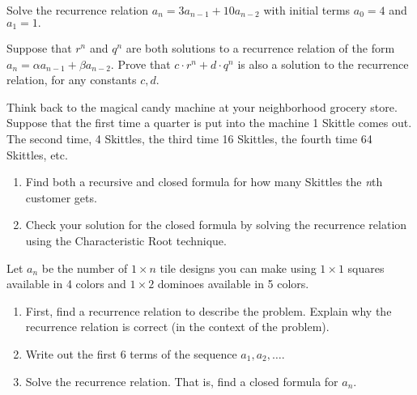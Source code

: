 \documentclass[11pt,]{book}
\theoremstyle{ptxplainnotitle}
\theoremstyle{ptxplaintitle}
\theoremstyle{ptxdefinitionnotitle}
\theoremstyle{ptxdefinitiontitle}
\theoremstyle{ptxdefinitionnotitle}
\theoremstyle{ptxdefinitiontitle}
\theoremstyle{ptxdefinitionnotitle}
\theoremstyle{ptxdefinitiontitle}
\theoremstyle{ptxdefinitiontitlenonumber}
\theoremstyle{ptxdefinitiontitlenonumber}
\numberwithin{equation}{chapter}
\begin{document}
\begin{divisionexercise}{7}\hypertarget{exercise-48}{}
\hypertarget{p-502}{}%
Solve the recurrence relation \(a_n = 3a_{n-1} + 10a_{n-2}\) with initial terms \(a_0 = 4\) and \(a_1 = 1\text{.}\)%
\end{divisionexercise}%
\begin{divisionexercise}{8}\hypertarget{exercise-49}{}
\hypertarget{p-505}{}%
Suppose that \(r^n\) and \(q^n\) are both solutions to a recurrence relation of the form \(a_n = \alpha a_{n-1} + \beta a_{n-2}\).  Prove that \(c\cdot r^n + d \cdot q^n\) is also a solution to the recurrence relation, for any constants \(c, d\).%
\end{divisionexercise}%
\begin{divisionexercise}{9}\hypertarget{exercise-50}{}
\hypertarget{p-506}{}%
Think back to the magical candy machine at your neighborhood grocery store. Suppose that the first time a quarter is put into the machine 1 Skittle comes out. The second time, 4 Skittles, the third time 16 Skittles, the fourth time 64 Skittles, etc. \leavevmode%
\begin{enumerate}[label=(\alph*)]
\item\hypertarget{li-227}{}\hypertarget{p-507}{}%
Find both a recursive and closed formula for how many Skittles the \emph{n}th customer gets.%
\item\hypertarget{li-228}{}\hypertarget{p-508}{}%
Check your solution for the closed formula by solving the recurrence relation using the Characteristic Root technique.%
\end{enumerate}
%
\end{divisionexercise}%
\begin{divisionexercise}{10}\hypertarget{exercise-51}{}
\hypertarget{p-509}{}%
Let \(a_n\) be the number of \(1 \times n\) tile designs you can make using \(1 \times 1\) squares available in 4 colors and \(1 \times 2\) dominoes available in 5 colors. \leavevmode%
\begin{enumerate}[label=(\alph*)]
\item\hypertarget{li-229}{}\hypertarget{p-510}{}%
First, find a recurrence relation to describe the problem. Explain why the recurrence relation is correct (in the context of the problem).%
\item\hypertarget{li-230}{}\hypertarget{p-511}{}%
Write out the first 6 terms of the sequence \(a_1, a_2, \ldots\).%
\item\hypertarget{li-231}{}\hypertarget{p-512}{}%
Solve the recurrence relation. That is, find a closed formula for \(a_n\).%
\end{enumerate}
%
\end{divisionexercise}%
\end{document}
